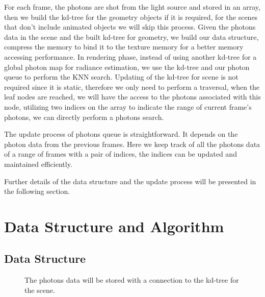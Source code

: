 For each frame, the photons are shot from the light source and stored in an array, then we build the kd-tree for the geometry objects if it is required, for the scenes that don't include animated objects we will skip this process. Given the photons data in the scene and the built kd-tree for geometry, we build our data structure, compress the memory to bind it to the texture memory for a better memory accessing performance.
In rendering phase, instead of using another kd-tree for a global photon map for radiance estimation, we use the kd-tree and our photon queue to perform the KNN search. Updating of the kd-tree for scene is not required since it is static, therefore we only need to perform a traversal, when the leaf nodes are reached, we will have the access to the photons associated with this node, utilizing two indices on the array to indicate the range of current frame's photons, we can directly perform a photons search.

The update process of photons queue is straightforward. It depends on the photon data from the previous frames. Here we keep track of all the photons data of a range of frames with a pair of indices, the indices can be updated and maintained efficiently.

Further details of the data structure and the update process will be presented in the following section.

\section{Data Structure and Algorithm}

\subsection{Data Structure}

\begin{figure}
    \centering
    \renewcommand{\thefigure}{\thechapter.\arabic{figure}}
    \caption[Association of kd-tree and photons data]{The photons data will be stored with a connection to the kd-tree for the scene. }
    \label{fig:kd_leaf_photons}
\end{figure}

